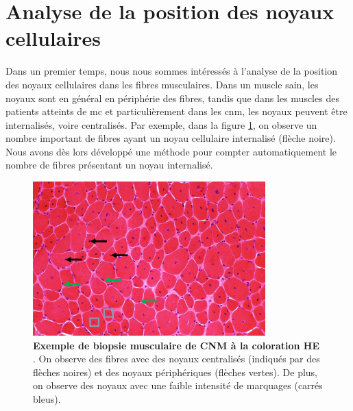\section{Analyse de la position des noyaux cellulaires}
Dans un premier temps, nous nous sommes intéressés à l'analyse de la position des noyaux cellulaires dans les fibres musculaires. Dans un muscle sain, les noyaux sont en général en périphérie des fibres, tandis que dans les muscles des patients atteints de \gls{mc} et particulièrement dans les \gls{cnm}, les noyaux peuvent être internalisés, voire centralisés. Par exemple, dans la figure \ref{fig:he_example}, on observe un nombre important de fibres ayant un noyau cellulaire internalisé (flèche noire). Nous avons dès lors développé une méthode pour compter automatiquement le nombre de fibres présentant un noyau internalisé.
\begin{figure}[!ht]
 \centering
 \includegraphics[width=0.8\textwidth]{figures/he_example.jpg}
 \caption[Exemple de biopsie musculaire à la coloration HE]{\textbf{Exemple de biopsie musculaire de CNM à la coloration HE }. On observe des fibres avec des noyaux centralisés (indiqués par des flèches noires) et des noyaux périphériques (flèches vertes). De plus, on observe des noyaux avec une faible intensité de marquages (carrés bleus).}
 \label{fig:he_example}
\end{figure}

